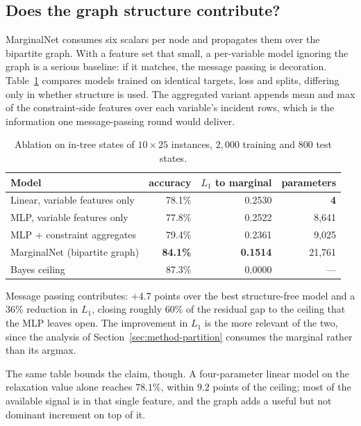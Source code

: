 \documentclass[preprint,12pt]{elsarticle}
\begin{document}
\subsection{Does the graph structure contribute?}
\label{sec:exp-ablation}

MarginalNet consumes six scalars per node and propagates them over the bipartite graph. With a feature set that small, a per-variable model ignoring the graph is a serious baseline: if it matches, the message passing is decoration. Table~\ref{tab:ablation} compares models trained on identical targets, loss and splits, differing only in whether structure is used. The aggregated variant appends mean and max of the constraint-side features over each variable's incident rows, which is the information one message-passing round would deliver.

\begin{table}[h]
\centering
\begin{tabular}{lrrr}
\toprule
Model & accuracy & $L_1$ to marginal & parameters \\
\midrule
Linear, variable features only & 78.1\% & 0.2530 & \textbf{4} \\
MLP, variable features only & 77.8\% & 0.2522 & 8{,}641 \\
MLP + constraint aggregates & 79.4\% & 0.2361 & 9{,}025 \\
MarginalNet (bipartite graph) & \textbf{84.1\%} & \textbf{0.1514} & 21{,}761 \\
\midrule
Bayes ceiling & 87.3\% & 0.0000 & --- \\
\bottomrule
\end{tabular}
\caption{Ablation on in-tree states of $10\times25$ instances, $2{,}000$ training and $800$ test states.}
\label{tab:ablation}
\end{table}

Message passing contributes: $+4.7$ points over the best structure-free model and a $36\%$ reduction in $L_1$, closing roughly $60\%$ of the residual gap to the ceiling that the MLP leaves open. The improvement in $L_1$ is the more relevant of the two, since the analysis of Section~\ref{sec:method-partition} consumes the marginal rather than its argmax.

The same table bounds the claim, though. A four-parameter linear model on the relaxation value alone reaches $78.1\%$, within $9.2$ points of the ceiling; most of the available signal is in that single feature, and the graph adds a useful but not dominant increment on top of it.
\end{document}
